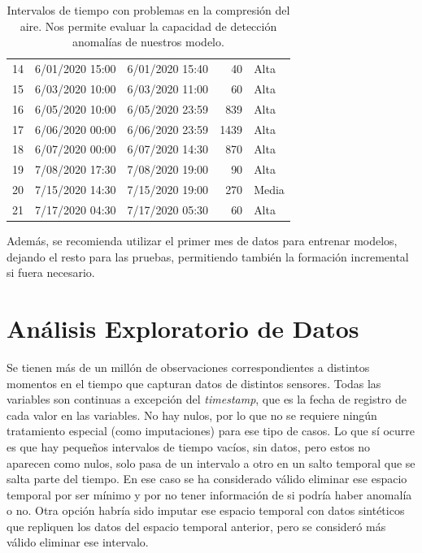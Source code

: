 \documentclass[12pt,letterpaper]{article}
\begin{document}
\begin{table}[htp]
\begin{tabular}{cllrl}
14           & 6/01/2020 15:00          & 6/01/2020 15:40           & 40                 & Alta              \\
15           & 6/03/2020 10:00          & 6/03/2020 11:00           & 60                 & Alta              \\
16           & 6/05/2020 10:00          & 6/05/2020 23:59           & 839                & Alta              \\
17           & 6/06/2020 00:00          & 6/06/2020 23:59           & 1439               & Alta              \\
18           & 6/07/2020 00:00          & 6/07/2020 14:30           & 870                & Alta              \\
19           & 7/08/2020 17:30          & 7/08/2020 19:00           & 90                 & Alta              \\
20           & 7/15/2020 14:30          & 7/15/2020 19:00           & 270                & Media            \\ 
21           & 7/17/2020 04:30          & 7/17/2020 05:30           & 60                 & Alta              \\ \hline
\end{tabular}
    \caption{
    Intervalos de tiempo con problemas en la compresión del aire.
    Nos permite evaluar la capacidad de detección anomalías de nuestros modelo.}
    \label{tab:Reportes}
\end{table}

Además, se recomienda utilizar el primer mes de datos para entrenar modelos, dejando el resto para las pruebas, permitiendo también la formación incremental si fuera necesario.


\section{Análisis Exploratorio de Datos}
Se tienen más de un millón de observaciones correspondientes a distintos momentos en el tiempo que capturan datos de distintos sensores. Todas las variables son continuas a excepción del \textit{timestamp}, que es la fecha de registro de cada valor en las variables.
No hay nulos, por lo que no se requiere ningún tratamiento especial (como imputaciones) para ese tipo de casos. Lo que sí ocurre es que hay pequeños intervalos de tiempo vacíos, sin datos, pero estos no aparecen como nulos, solo pasa de un intervalo a otro en un salto temporal que se salta parte del tiempo. En ese caso se ha considerado válido eliminar ese espacio temporal por ser mínimo y por no tener información de si podría haber anomalía o no. Otra opción habría sido imputar ese espacio temporal con datos sintéticos que repliquen los datos del espacio temporal anterior, pero se consideró más válido eliminar ese intervalo.
\end{document}
